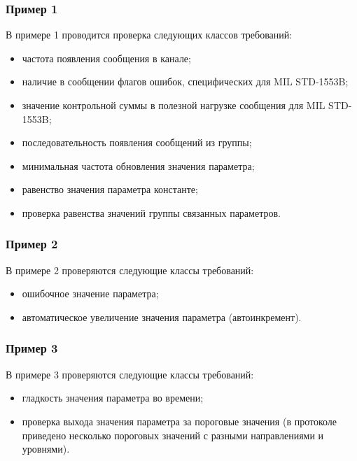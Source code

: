 \subsubsection{Пример 1}

В примере 1 проводится проверка следующих классов требований:

\begin{itemize}
 \item частота появления сообщения в канале;
 \item наличие в сообщении флагов ошибок, специфических для MIL STD-1553B;
 \item значение контрольной суммы в полезной нагрузке сообщения для MIL 
STD-1553B;
 \item последовательность появления сообщений из группы;
 \item минимальная частота обновления значения параметра;
 \item равенство значения параметра константе;
 \item проверка равенства значений группы связанных параметров.
\end{itemize}

\subsubsection{Пример 2}

В примере 2 проверяются следующие классы требований:

\begin{itemize}
 \item ошибочное значение параметра;
 \item автоматическое увеличение значения параметра (автоинкремент).
\end{itemize}

\subsubsection{Пример 3}

В примере 3 проверяются следующие классы требований:

\begin{itemize}
 \item гладкость значения параметра во времени;
 \item проверка выхода значения параметра за пороговые значения (в протоколе 
приведено несколько пороговых значений с разными направлениями и уровнями).
\end{itemize}

